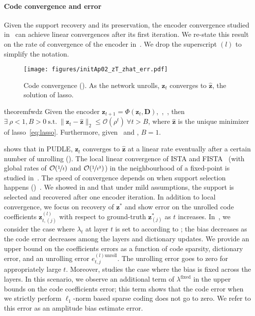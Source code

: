 \documentclass[10pt]{article} %
\newcommand{\D}{{\bm D}}
\newcommand{\z}{{\bm z}}
\begin{document}
\paragraph{Code convergence and error}  Given the support recovery and its preservation, the encoder convergence studied in~\citep{malezieux2022understanding} can achieve linear convergences after its first iteration. We re-state this result on the rate of convergence of the encoder in~. We drop the superscript $(l)$ to simplify the notation.
%
\begin{wrapfigure}[14]{r}{0.35\textwidth}
	\centering
	\texttt{[image: figures/initAp02\_zT\_zhat\_err.pdf]}
	\caption{Code convergence (). As the network unrolls, $\z_t$ converges to $\hat \z$, the solution of lasso.}
	\label{fig:forwardpass}
\end{wrapfigure}
%
%
%
\begin{restatable}{theorem}{fwdz}\label{thm:fwdz}
Given the encoder $\z_{t+1} = \Phi(\z_{t}, \D)$,~,~, then $\exists\ \rho <1, B > 0\ \text{s.t.}\ \| \z_{t} - \hat \z \|_2  \leq \mathcal{O}(\rho^{t})\ \forall t > B$, where $\hat \z$ is the unique minimizer of lasso~\eqref{eq:lasso}. Furthermore, given~ and , $B = 1$.
\end{restatable}
%
 shows that in PUDLE, $\z_t$ converges to $\hat \z$ at a linear rate eventually after a certain number of unrolling (). The local linear convergence of ISTA and FISTA~\citep{beck2009fast} (with global rates of $\mathcal{O}(\nicefrac{1}{t})$ and $\mathcal{O}(\nicefrac{1}{t^2})$) in the neighbourhood of a fixed-point is studied in~\citep{tao2016local}. The speed of convergence depends on when support selection happens ()~\citep{bredies2008linear,zhang2017new, liang2014local}. We showed in  and  that under mild assumptions, the support is selected and recovered after one encoder iteration. In addition to local convergence, we focus on recovery of $\z^{\ast}$ and show error on the unrolled code coefficients $\z_{t, (j)}^{(l)}$ with respect to ground-truth $\z_{(j)}^{\ast}$ as $t$ increases. In~, we consider the case where $\lambda_t$ at layer $t$ is set to according to ; the bias decreases as the code error decreases among the layers and dictionary updates. We provide an upper bound on the coefficients errors as a function of code sparsity, dictionary error, and an unrolling error $e_{t,j}^{(l)\text{unroll}}$. The unrolling error goes to zero for appropriately large $t$. Moreover,  studies the case where the bias is fixed across the layers. In this scenario, we observe an additional term of $\lambda^{\text{fixed}}$ in the upper bounds on the code coefficients error; this term shows that the code error when we strictly perform $\ell_1$-norm based sparse coding does not go to zero. We refer to this error as an amplitude bias estimate error.
\end{document}
